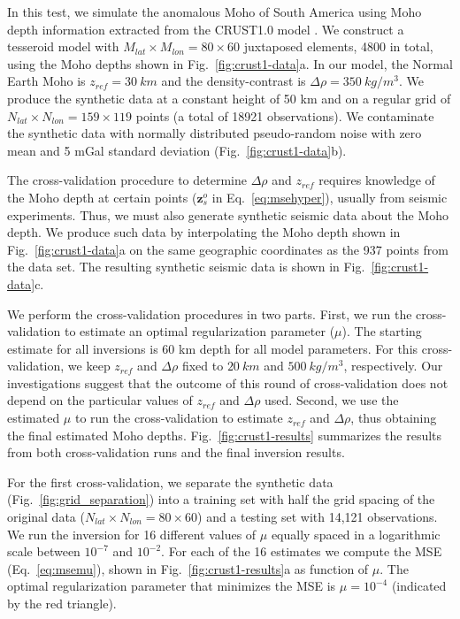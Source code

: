 \documentclass[extra]{gji}
\begin{document}
In this test, we simulate the anomalous Moho of South America
using Moho depth information extracted from the CRUST1.0 model
\citep{laske2013}.
We construct a tesseroid model with
$M_{lat} \times M_{lon} = 80 \times 60$ juxtaposed elements, 4800 in total,
using the Moho depths shown in Fig.~\ref{fig:crust1-data}a.
In our model, the Normal Earth Moho is $z_{ref} = 30\ km$ and
the density-contrast is $\Delta\rho = 350\ kg/m^3$.
We produce the synthetic data at a constant height of 50 km
and on a regular grid of $N_{lat} \times N_{lon} = 159 \times 119$ points
(a total of 18921 observations).
We contaminate the synthetic data with normally distributed pseudo-random noise
with zero mean and 5 mGal standard deviation (Fig.~\ref{fig:crust1-data}b).

The cross-validation procedure to determine $\Delta\rho$ and $z_{ref}$
requires knowledge of the Moho depth at certain points
($\mathbf{z}_s^o$ in Eq.~\ref{eq:msehyper}),
usually from seismic experiments.
Thus, we must also generate synthetic seismic data about the Moho depth.
We produce such data by interpolating the Moho depth shown in
Fig.~\ref{fig:crust1-data}a on the same geographic coordinates
as the 937 points from the \citet{assumpcao2012} data set.
The resulting synthetic seismic data is shown in Fig.~\ref{fig:crust1-data}c.

We perform the cross-validation procedures in two parts.
First, we run the cross-validation to estimate
an optimal regularization parameter ($\mu$).
The starting estimate for all inversions is
60 km depth for all model parameters.
For this cross-validation,
we keep $z_{ref}$ and $\Delta\rho$ fixed to
$20\ km$ and $500\ kg/m^3$, respectively.
Our investigations suggest that the outcome of this round of cross-validation
does not depend on the particular values of $z_{ref}$ and $\Delta\rho$ used.
Second, we use the estimated $\mu$ to run the cross-validation
to estimate $z_{ref}$ and $\Delta\rho$,
thus obtaining the final estimated Moho depths.
Fig.~\ref{fig:crust1-results} summarizes the results
from both cross-validation runs and the final inversion results.

For the first cross-validation,
we separate the synthetic data (Fig.~\ref{fig:grid_separation}) into
a training set with half the grid spacing of the original data
($N_{lat} \times N_{lon} = 80 \times 60$)
and a testing set with 14,121 observations.
We run the inversion for 16 different values of $\mu$
equally spaced in a logarithmic scale between $10^{-7}$ and $10^{-2}$.
For each of the 16 estimates we compute the MSE (Eq.~\ref{eq:msemu}),
shown in Fig.~\ref{fig:crust1-results}a as function of $\mu$.
The optimal regularization parameter that minimizes the MSE is $\mu = 10^{-4}$
(indicated by the red triangle).
\end{document}
